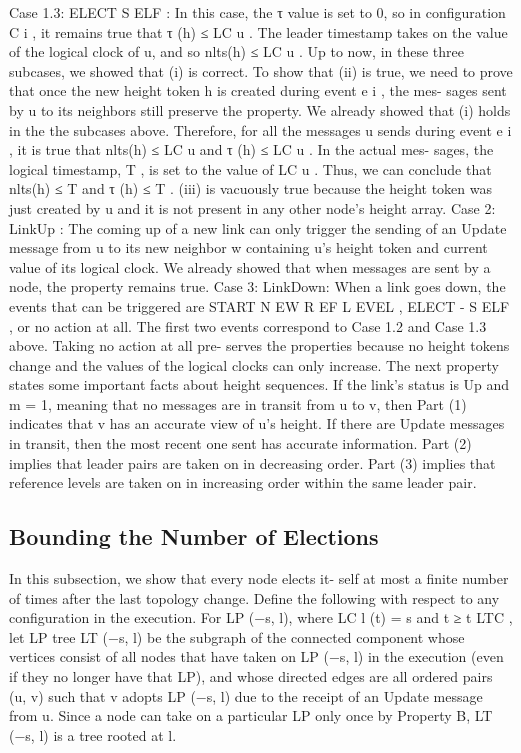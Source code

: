 \documentclass{article}
\begin{document}
Case 1.3: ELECT S ELF : In this case, the τ value is set
to 0, so in configuration C i , it remains true that τ (h) ≤ LC u .
The leader timestamp takes on the value of the logical clock
of u, and so nlts(h) ≤ LC u .
Up to now, in these three subcases, we showed that (i) is
correct. To show that (ii) is true, we need to prove that once
the new height token h is created during event e i , the mes-
sages sent by u to its neighbors still preserve the property.
We already showed that (i) holds in the the subcases above.
Therefore, for all the messages u sends during event e i , it is
true that nlts(h) ≤ LC u and τ (h) ≤ LC u . In the actual mes-
sages, the logical timestamp, T , is set to the value of LC u .
Thus, we can conclude that nlts(h) ≤ T and τ (h) ≤ T .
(iii) is vacuously true because the height token was just
created by u and it is not present in any other node’s height
array.
Case 2: LinkUp : The coming up of a new link can only
trigger the sending of an Update message from u to its new
neighbor w containing u’s height token and current value of
its logical clock. We already showed that when messages
are sent by a node, the property remains true.
Case 3: LinkDown: When a link goes down, the events
that can be triggered are START N EW R EF L EVEL , ELECT -
S ELF , or no action at all. The first two events correspond to
Case 1.2 and Case 1.3 above. Taking no action at all pre-
serves the properties because no height tokens change and
the values of the logical clocks can only increase.
The next property states some important facts about
height sequences. If the link’s status is Up and m = 1,
meaning that no messages are in transit from u to v, then
Part (1) indicates that v has an accurate view of u’s height.
If there are Update messages in transit, then the most
recent one sent has accurate information. Part (2) implies
that leader pairs are taken on in decreasing order. Part (3)
implies that reference levels are taken on in increasing
order within the same leader pair.


\subsection{Bounding the Number of Elections}
In this subsection, we show that every node elects it-
self at most a finite number of times after the last topology
change.
Define the following with respect to any configuration
in the execution. For LP (−s, l), where LC l (t) = s and
t ≥ t LTC , let LP tree LT (−s, l) be the subgraph of the
connected component whose vertices consist of all nodes
that have taken on LP (−s, l) in the execution (even if they
no longer have that LP), and whose directed edges are all
ordered pairs (u, v) such that v adopts LP (−s, l) due to the
receipt of an Update message from u. Since a node can take
on a particular LP only once by Property B, LT (−s, l) is a
tree rooted at l.
\end{document}
